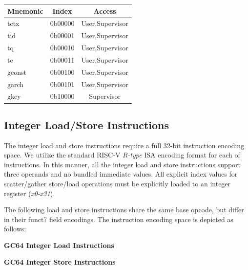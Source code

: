 \documentclass{article}
\begin{document}
\begin{center}
\begin{tabular}{| l | c | c | }
\hline
Mnemonic & Index & Access \\ \hline
\hline
tctx & 0b00000 & User,Supervisor \\
\hline
tid & 0b00001 & User,Supervisor \\
\hline
tq & 0b00010 & User,Supervisor \\
\hline
te & 0b00011 & User,Supervisor \\
\hline
gconst & 0b00100 & User,Supervisor \\
\hline
garch & 0b00101 & User,Supervisor \\
\hline
gkey & 0b10000 & Supervisor\\
\hline
\end{tabular}
\end{center}


\subsection{Integer Load/Store Instructions}

The integer load and store instructions require a full 32-bit
instruction encoding space.  We utilize the standard RISC-V
\emph{R-type} ISA encoding format for each of instructions.  In
this manner, all the integer load and store instructions support
three operands and no bundled immediate values.  All explicit index
values for scatter/gather store/load operations must be explicitly
loaded to an integer register (\emph{x0-x31}).

The following load and store instructions share the same base
opcode, but differ in their funct7 field encodings.  The instruction
encoding space is depicted as follows:


\begin{center}
\textbf{GC64 Integer Load Instructions}
\makebox[0.03in][s]{}\makebox[0.03in][s]{}\makebox[0.03in][s]{}\makebox[0.03in][s]{}\makebox[0.03in][s]{}
\end{center}

\begin{center}
\textbf{GC64 Integer Store Instructions}
\makebox[0.03in][s]{}\makebox[0.03in][s]{}\makebox[0.03in][s]{}\makebox[0.03in][s]{}\makebox[0.03in][s]{}
\end{center}
\end{document}
